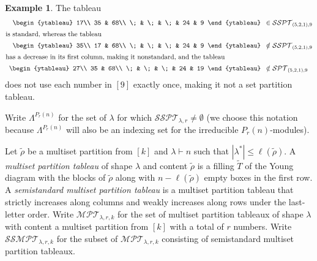 \documentclass[10pt]{amsart}
\theoremstyle{definition}
\theoremstyle{definition}
\newtheorem{exam}[exam]{Example}
\theoremstyle{plain}
\theoremstyle{remark}
\theoremstyle{plain}
\theoremstyle{plain}
\newcommand{\MPT}{\mathcal{MPT}}
\newcommand{\SPT}{\mathcal{SPT}}
\newcommand{\SSPT}{\mathcal{SSPT}}
\newcommand{\SSMPT}{\mathcal{SSMPT}}
\newcommand{\inline}[1]{\begin{array}{c}#1\end{array}}
\newcommand{\defn}[1]{\textcolor{defncolor}{\emph{#1}}}
\begin{document}
\begin{exam}The tableau
    \begin{align*}
\inline{\begin{ytableau}
        17\\
        35 & 68\\
        \; & \; & \; & 24 & 9
\end{ytableau}}&\in\SSPT_{(5,2,1),9}\\
        \intertext{is standard, whereas the tableau}
        \inline{\begin{ytableau}
        35\\
        17 & 68\\
        \; & \; & \; & 24 & 9
\end{ytableau}}&\notin\SSPT_{(5,2,1),9}\\
        \intertext{has a decrease in its first column, making it nonstandard, and the tableau}
        \inline{\begin{ytableau}
        27\\
        35 & 68\\
        \; & \; & \; & 24 & 19
\end{ytableau}}&\notin\SPT_{(5,2,1),9}\\
    \end{align*} does not use each number in $[9]$ exactly once, making it not a set partition tableau.
\end{exam}

Write $\Lambda^{P_r(n)}$ for the set of $\lambda$ for which $\SSPT_{\lambda,r}\neq\emptyset$ (we choose this notation because $\Lambda^{P_r(n)}$ will also be an indexing set for the irreducible $P_r(n)$-modules).

Let $\tilde\rho$ be a multiset partition from $[k]$ and $\lambda\vdash n$ such that $|\lambda^*|\leq\ell(\tilde\rho)$. A \defn{multiset partition tableau} of shape $\lambda$ and content $\tilde\rho$ is a filling $\tilde{T}$ of the Young diagram with the blocks of $\tilde\rho$ along with $n-\ell(\tilde\rho)$ empty boxes in the first row. A \defn{semistandard multiset partition tableau} is a multiset partition tableau that strictly increases along columns and weakly increases along rows under the last-letter order. Write $\MPT_{\lambda,r,k}$ for the set of multiset partition tableaux of shape $\lambda$ with content a multiset partition from $[k]$ with a total of $r$ numbers. Write $\SSMPT_{\lambda,r,k}$ for the subset of $\MPT_{\lambda,r,k}$ consisting of semistandard multiset partition tableaux.
\end{document}
